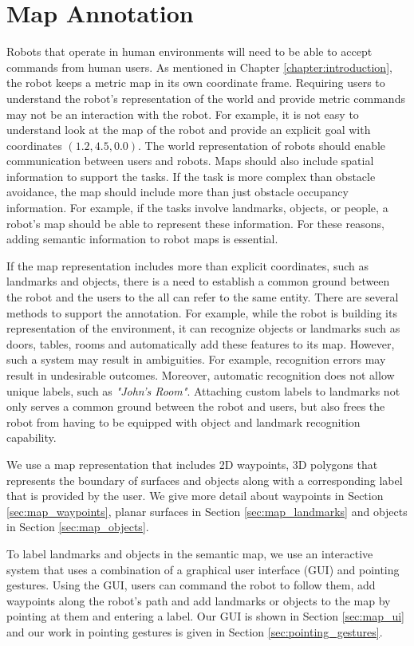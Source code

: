 \chapter{Map Annotation}
\label{chapter:map_annotation}

Robots that operate in human environments will need to be able to accept commands from human users. As mentioned in Chapter \ref{chapter:introduction}, the robot keeps a metric map in its own coordinate frame. Requiring users to understand the robot's representation of the world and provide metric commands may not be an interaction with the robot. For example, it is not easy to understand look at the map of the robot and provide an explicit  goal with coordinates $(1.2,4.5,0.0)$. The world representation of robots should enable communication between users and robots. Maps should also include spatial information to support the tasks. If the task is more complex than obstacle avoidance, the map should include more than just obstacle occupancy information. For example, if the tasks involve landmarks, objects, or people, a robot's map should be able to represent these information. For these reasons, adding semantic information to robot maps is essential.

If the map representation includes more than explicit coordinates, such as landmarks and objects, there is a need to establish a common ground between the robot and the users to the all can refer to the same entity. There are several methods to support the annotation. For example, while the robot is building its representation of the environment, it can recognize objects or landmarks such as doors, tables, rooms and automatically add these features to its map. However, such a system may result in ambiguities. For example, recognition errors may result in undesirable outcomes. Moreover, automatic recognition does not allow unique labels, such as \textit{"John's Room"}. Attaching custom labels to landmarks not only serves a common ground between the robot and users, but also frees the robot from having to be equipped with object and landmark recognition capability.

We use a map representation that includes 2D waypoints, 3D polygons that represents the boundary of surfaces and objects along with a corresponding label that is provided by the user. We give more detail about waypoints in Section \ref{sec:map_waypoints}, planar surfaces in Section \ref{sec:map_landmarks} and objects in Section \ref{sec:map_objects}.

To label landmarks and objects in the semantic map, we use an interactive system that uses a combination of a graphical user interface (GUI) and pointing gestures. Using the GUI, users can command the robot to follow them, add waypoints along the robot's path and add landmarks or objects to the map by pointing at them and entering a label. Our GUI is shown in Section \ref{sec:map_ui} and our work in pointing gestures is given in Section \ref{sec:pointing_gestures}.

